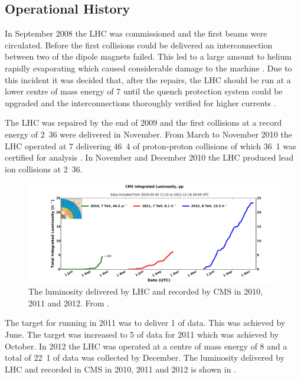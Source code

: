 \subsection{Operational History}
In September 2008 the {LHC} was commissioned and the first beams were
circulated.  Before the first collisions could be delivered an interconnection
between two of the dipole magnets failed. This led to
a large amount to helium rapidly evaporating which caused considerable damage to
the machine \cite{lebrun2009sector}.  Due to this incident it was decided that,
after the repairs,
the {LHC} should be run at a lower centre of mass energy of \unit{7}{\TeV} until
the quench protection system could be upgraded and the interconnections
thoroughly verified for higher currents \cite{myers2010lhc}.

The {LHC} was repaired by the end of 2009 and the first collisions at a record
energy of \unit{2.36}{\TeV} were delivered in November.  From March to November
2010 the {LHC} operated at \unit{7}{\TeV} delivering \unit{46.4}{\invpb} of
proton-proton collisions of which \unit{36.1}{\invpb} was certified for analysis
\cite{myers1990design}.  In November and December 2010 the {LHC} produced lead
ion collisions at \unit{2.36}{\TeV}.

\begin{figure}[htbp]
  \centering
  \includegraphics[width=\textwidth]{int_lumi_cumulative_pp_1}
  \caption[The luminosity delivered by LHC and recorded by CMS in 2010, 2011 and
2012.] {The luminosity delivered by LHC and recorded by CMS in 2010, 2011 and
2012. From \cite{intlumi}.}
  \label{fig:LHC2010}
\end{figure}

The target for running in 2011 was to deliver \unit{1}{\invfb} of data. This was
achieved by June. The target was increased to \unit{5}{\invfb} of data for 2011 which was achieved by October. 
In 2012 the {LHC} was operated at a centre of mass energy of \unit{8}{\TeV}
and a total of \unit{22.1}{\invfb} of data was collected by December.
The luminosity delivered by LHC and recorded in CMS in 2010, 2011 and 2012 is
shown in  \cite{intlumi}.

